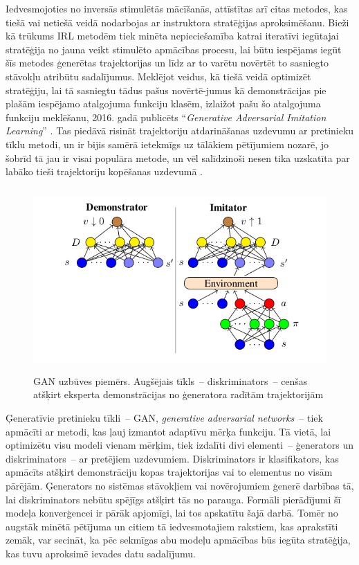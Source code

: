 \documentclass[12pt, a4paper]{article}
\numberwithin{equation}{section} %
\begin{document}
Iedvesmojoties no inversās stimulētās mācīšanās, attīstītas arī citas metodes, kas tiešā vai netiešā veidā nodarbojas ar instruktora stratēģijas aproksimēšanu. Bieži kā trūkums IRL metodēm tiek minēta nepieciešamība katrai iteratīvi iegūtajai stratēģija no jauna veikt stimulēto apmācības procesu, lai būtu iespējams iegūt šīs metodes ģenerētas trajektorijas un līdz ar to varētu novērtēt to sasniegto stāvokļu atribūtu sadalījumus. Meklējot veidus, kā tiešā veidā optimizēt stratēģiju, lai tā sasniegtu tādus pašus novērtē-jumus kā demonstrācijas pie plašām iespējamo atalgojuma funkciju klasēm, izlaižot pašu šo atalgojuma funkciju meklēšanu, 2016. gadā publicēts ``\textit{Generative Adversarial Imitation Learning}'' \cite{ho2016generative}. Tas piedāvā risināt trajektoriju atdarināšanas uzdevumu ar pretinieku tīklu metodi, un ir bijis samērā ietekmīgs uz tālākiem pētījumiem nozarē, jo šobrīd tā jau ir visai populāra metode, un vēl salīdzinoši nesen tika uzskatīta par labāko tieši trajektoriju kopēšanas uzdevumā \cite{torabi2018generative}.

\begin{figure}[t!]
    \centering
    \includegraphics[height=7cm,page=1]{../img/GAN.png}
    \caption{GAN uzbūves piemērs. Augšējais tīkls~-- diskriminators~-- cenšas atšķirt eksperta demonstrācijas no ģeneratora radītām trajektorijām \cite{torabi2018generative}}
    \label{GAN_img}
\end{figure}

Ģeneratīvie pretinieku tīkli~-- GAN, \textit{generative adversarial networks}~-- tiek apmācīti ar metodi, kas ļauj izmantot adaptīvu mērķa funkciju. Tā vietā, lai optimizētu visu modeli vienam mērķim, tiek izdalīti divi elementi~-- ģenerators un diskriminators~-- ar pretējiem uzdevumiem. Diskriminators ir klasifikators, kas apmācīts atšķirt demonstrāciju kopas trajektorijas vai to elementus no visām pārējām. Ģenerators no sistēmas stāvokļiem vai novērojumiem ģenerē darbības tā, lai diskriminators nebūtu spējīgs atšķirt tās no parauga. Formāli pierādījumi šī modeļa konverģencei ir pārāk apjomīgi, lai tos apskatītu šajā darbā. Tomēr no augstāk minētā pētījuma un citiem tā iedvesmotajiem rakstiem, kas aprakstīti zemāk, var secināt, ka pēc sekmīgas abu modeļu apmācības būs iegūta stratēģija, kas tuvu aproksimē ievades datu sadalījumu.
\end{document}
